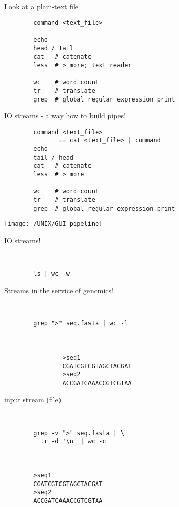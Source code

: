 \documentclass[xcolor=dvipsnames]{beamer}
\begin{document}
\begin{frame}[fragile]
	\huge
	Look at a plain-text file
	\Large
	\begin{verbatim}
		command <text_file>

		echo
		head / tail
		cat   # catenate
		less  # > more; text reader

		wc    # word count
		tr    # translate
		grep  # global regular expression print
	\end{verbatim}
\end{frame}

\begin{frame}[fragile]
	\huge
	IO streams - a way how to build pipes!
	\Large
	\begin{verbatim}
		command <text_file>
	           == cat <text_file> | command
		echo
		tail / head
		cat   # catenate
		less  # > more

		wc    # word count
		tr    # translate
		grep  # global regular expression print
	\end{verbatim}
\end{frame}

\begin{frame}
	\begin{center}
		\texttt{[image: /UNIX/GUI\_pipeline]}
	\end{center}
\end{frame}

\begin{frame}[fragile]
	\huge
	IO streams!
	\Large
	\begin{verbatim}


		ls | wc -w
	\end{verbatim}
\end{frame}

\begin{frame}[fragile]
	\huge
	Streams in the service of genomics!
	\Large
	\begin{verbatim}


		grep ">" seq.fasta | wc -l



				>seq1
				CGATCGTCGTAGCTACGAT
				>seq2
				ACCGATCAAACCGTCGTAA
	\end{verbatim}
\end{frame}

\begin{frame}[fragile]
	\huge
	input stream (file)
	\Large
	\begin{verbatim}


		grep -v ">" seq.fasta | \
		  tr -d '\n' | wc -c



		>seq1
		CGATCGTCGTAGCTACGAT
		>seq2
		ACCGATCAAACCGTCGTAA
	\end{verbatim}
\end{frame}
\end{document}
